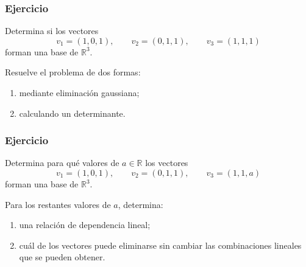 \begin{frame}
    \frametitle{Ejercicio}

    Determina si los vectores
    \[
        v_1=(1,0,1),\qquad
        v_2=(0,1,1),\qquad
        v_3=(1,1,1)
    \]
    forman una base de \(\mathbb{R}^3\).

    \medskip

    Resuelve el problema de dos formas:

    \begin{enumerate}
        \item mediante eliminación gaussiana;
        \item calculando un determinante.
    \end{enumerate}
\end{frame}


\begin{frame}
    \frametitle{Ejercicio}

    Determina para qué valores de \(a\in\mathbb{R}\) los vectores
    \[
        v_1=(1,0,1),\qquad
        v_2=(0,1,1),\qquad
        v_3=(1,1,a)
    \]
    forman una base de \(\mathbb{R}^3\).

    \medskip

    Para los restantes valores de \(a\), determina:

    \begin{enumerate}
        \item una relación de dependencia lineal;
        \item cuál de los vectores puede eliminarse sin cambiar
        las combinaciones lineales que se pueden obtener.
    \end{enumerate}
\end{frame}

